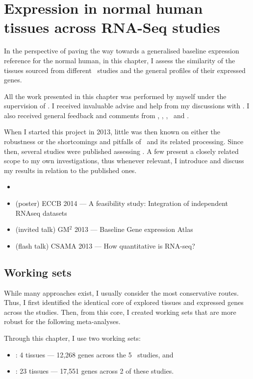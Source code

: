 \chapter{Expression in normal human tissues across RNA-Seq studies}
\label{ch:Transcriptomics}

In the perspective of paving the way towards
a generalised baseline expression reference for the normal human,
in this chapter, I assess the similarity
of the tissues sourced from different \Rnaseq\ studies and
the general profiles of their expressed genes.

All the work presented in this chapter was performed by myself under the
supervision of \alvis.
I received invaluable advise and help from my discussions with \nuno.
I also received general feedback and comments from \mar, \johan, \sarah, \gos\
and \wolfgang.

When I started this project in 2013,
little was then known on either the robustness or
the shortcomings and pitfalls of \Rnaseq\ and
its related processing.
Since then, several studies were published assessing \Rnaseq.
A few present a closely related scope to my own investigations, thus
whenever relevant,
I introduce and discuss my results in relation to the published ones.

\derivativeWork{}
\begin{itemize}[topsep=0pt,nosep]
    \item {}
    \item (poster) ECCB 2014 --- A feasibility study:
        Integration of independent RNAseq datasets
    \item (invited talk) GM$^2$ 2013 --- Baseline Gene expression Atlas
    \item (flash talk) CSAMA 2013 --- How quantitative is RNA-seq?
\end{itemize}
\clearpage

\section{Working sets}

While many approaches exist,
I usually consider the most conservative routes.
Thus, I first identified the identical core of
explored tissues and expressed genes across the studies.
Then, from this core, I created working sets
that are more robust for the following meta-analyses.

Through this chapter, I use two working sets:
\begin{itemize}[topsep=0pt,nosep]
    \item \setOne: 4 tissues --- 12,268 genes across the 5 \Rnaseq\ studies, and
    \item \setTwo: 23 tissues --- 17,551 genes across 2 of these studies.
\end{itemize}

